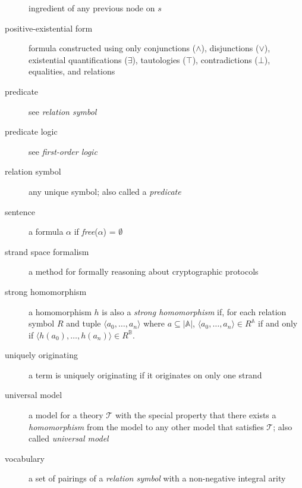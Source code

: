 \begin{description}
			ingredient of any previous node on $s$
		\item[positive-existential form]
			formula constructed using only conjunctions ($\wedge$),
			disjunctions ($\vee$), existential quantifications ($\exists$),
			tautologies ($\top$), contradictions ($\bot$), equalities, and
			relations
		\item[predicate]
			see \emph{relation symbol}
		\item[predicate logic]
			see \emph{first-order logic}
		\item[relation symbol]
			any unique symbol; also called a \emph{predicate}
		\item[sentence]
			a formula $\alpha$ if \emph{free}($\alpha$) = $\emptyset$
		\item[strand space formalism]
			a method for formally reasoning about cryptographic protocols
		\item[strong homomorphism]
			a homomorphism $h$ is also a \emph{strong homomorphism} if, for each
			relation symbol $R$ and tuple $\langle a_0 , \ldots , a_n \rangle$
			where $a \subseteq |\mathbb{A}|$, $\langle a_0 , \ldots , a_n  \rangle
			\in R^\mathbb{A}$ if and only if $\langle h(a_0) , \ldots , h(a_n)
			\rangle \in R^\mathbb{B}$.
		\item[uniquely originating]
			a term is uniquely originating if it originates on only one strand
		\item[universal model]
			a model for a theory $\mathcal{T}$ with the special property that
			there exists a \emph{homomorphism} from the model to any other
			model that satisfies $\mathcal{T}$; also called \emph{universal
			model}
		\item[vocabulary]
			a set of pairings of a \emph{relation symbol} with a non-negative
			integral arity
	\end{description}
